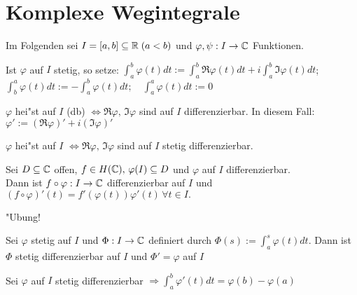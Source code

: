 \documentclass[a4paper,twoside,DIV15,BCOR12mm]{scrbook}
\begin{document}
\chapter{Komplexe Wegintegrale}

Im Folgenden sei $I= [a,b] \subseteq \mathbb{R} \; (a<b)$ und $\varphi,\psi: I \rightarrow \mathbb{C}$ Funktionen.

\begin{definition}
\begin{liste}
\item Ist $\varphi$ auf $I$ stetig, so setze: $\int_a^b \varphi(t)dt := \int_a^b \Re \varphi(t)dt + i \int_a^b \Im \varphi(t)dt$; \quad $\int_b^a \varphi(t)dt := -\int_a^b \varphi(t)dt; \quad \int_a^a \varphi(t)dt := 0$
\item $\varphi$ hei"st auf $I$  (db) $\Leftrightarrow \Re \varphi, \, \Im \varphi$ sind auf $I$ differenzierbar.
In diesem Fall: $\varphi' := (\Re \varphi)' + i(\Im \varphi)'$
\item $\varphi$ hei"st auf $I$  $\Leftrightarrow \Re \varphi, \, \Im \varphi$ sind auf $I$ stetig differenzierbar.\\
\end{liste}
\end{definition}

\begin{samepage}\begin{satz}
Sei $D \subseteq \mathbb{C}$ offen, $f\in H(\mathbb{C}), \, \varphi(I) \subseteq D$ und $\varphi$ auf $I$ differenzierbar.\\
 Dann ist $f \circ \varphi: I \rightarrow \mathbb{C}$ differenzierbar auf $I$ und $(f \circ \varphi)'(t) = f'(\varphi(t))\varphi'(t) \, \forall t \in I.$
\end{satz}\end{samepage}

\begin{beweis}
"Ubung!
\end{beweis}

\begin{samepage}\begin{satz}
\begin{liste}
\item Sei $\varphi$ stetig auf $I$ und $\Phi: I \rightarrow \mathbb{C}$ definiert durch $\Phi(s):= \int_a^s \varphi(t)dt$. Dann ist $\Phi$ stetig differenzierbar auf $I$ und $\Phi' = \varphi$ auf $I$
\item Sei $\varphi$ auf $I$ stetig differenzierbar $\Rightarrow \int_a^b \varphi'(t)dt = \varphi(b) - \varphi(a)$
\end{liste}
\end{satz}\end{samepage}
\end{document}
